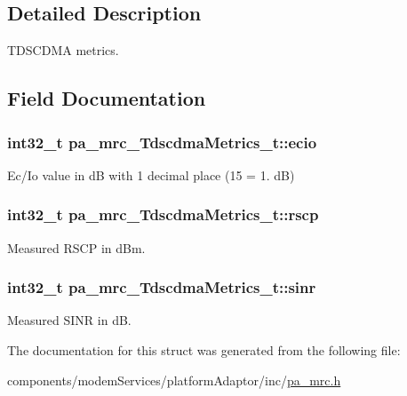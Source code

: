 \subsection{Detailed Description}
T\+D\+S\+C\+D\+MA metrics. 

\subsection{Field Documentation}
\subsubsection[{\texorpdfstring{ecio}{ecio}}]{\setlength{\rightskip}{0pt plus 5cm}int32\+\_\+t pa\+\_\+mrc\+\_\+\+Tdscdma\+Metrics\+\_\+t\+::ecio}\hypertarget{structpa__mrc___tdscdma_metrics__t_ab51b7909942c4fc154be788028c09d86}{}\label{structpa__mrc___tdscdma_metrics__t_ab51b7909942c4fc154be788028c09d86}


Ec/\+Io value in dB with 1 decimal place (15 = 1. dB) 

\subsubsection[{\texorpdfstring{rscp}{rscp}}]{\setlength{\rightskip}{0pt plus 5cm}int32\+\_\+t pa\+\_\+mrc\+\_\+\+Tdscdma\+Metrics\+\_\+t\+::rscp}\hypertarget{structpa__mrc___tdscdma_metrics__t_a99d9ab9385e51a413b2cc28cc31d08cb}{}\label{structpa__mrc___tdscdma_metrics__t_a99d9ab9385e51a413b2cc28cc31d08cb}


Measured R\+S\+CP in d\+Bm. 

\subsubsection[{\texorpdfstring{sinr}{sinr}}]{\setlength{\rightskip}{0pt plus 5cm}int32\+\_\+t pa\+\_\+mrc\+\_\+\+Tdscdma\+Metrics\+\_\+t\+::sinr}\hypertarget{structpa__mrc___tdscdma_metrics__t_ae87a73f4ea1b84c38ddf187ec1d73a5d}{}\label{structpa__mrc___tdscdma_metrics__t_ae87a73f4ea1b84c38ddf187ec1d73a5d}


Measured S\+I\+NR in dB. 



The documentation for this struct was generated from the following file\+:\begin{DoxyCompactItemize}
\item 
components/modem\+Services/platform\+Adaptor/inc/\hyperlink{pa__mrc_8h}{pa\+\_\+mrc.\+h}\end{DoxyCompactItemize}
